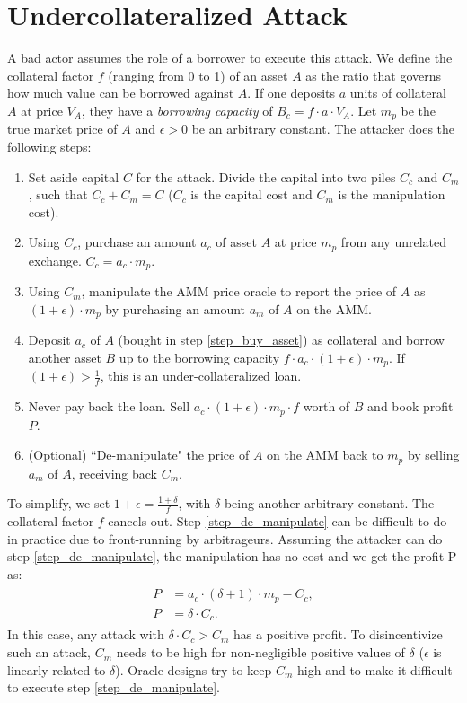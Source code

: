 \section{Undercollateralized Attack}
\label{appendix_a}
A bad actor assumes the role of a borrower to execute this attack. We define the collateral factor $f$ (ranging from 0 to 1) of an asset $A$ as the ratio that governs how much value can be borrowed against $A$. If one deposits $a$ units of collateral $A$ at price $V_A$, they have a \textit{borrowing capacity} of $B_c = f \cdot a \cdot V_A$. Let $m_p$ be the true market price of $A$ and $\epsilon > 0$ be an arbitrary constant. The attacker does the following steps:
\begin{enumerate}
    \item Set aside capital $C$ for the attack. Divide the capital into two piles $C_c$ and $C_m$, such that $C_c + C_m = C$ ($C_c$ is the capital cost and $C_m$ is the manipulation cost). 
    \item \label{step_buy_asset} Using $C_c$, purchase an amount $a_c$ of asset $A$ at price $m_p$ from any unrelated exchange. $C_c = a_c \cdot m_p$.
    \item \label{step_manipulate} Using $C_m$, manipulate the AMM price oracle to report the price of $A$ as $(1 + \epsilon) \cdot m_p$ by purchasing an amount $a_m$ of $A$ on the AMM.
    \item Deposit $a_c$ of $A$ (bought in step \ref{step_buy_asset}) as collateral and borrow another asset $B$ up to the borrowing capacity $f \cdot a_c \cdot (1 + \epsilon)\cdot m_p$. If $(1 + \epsilon) > \frac{1}{f}$, this is an under-collateralized loan.
    \item Never pay back the loan. Sell $a_c \cdot (1 + \epsilon)\cdot m_p \cdot f$ worth of $B$ and book profit $P$.
    \item \label{step_de_manipulate} (Optional) ``De-manipulate" the price of $A$ on the AMM back to $m_p$ by selling $a_m$ of $A$, receiving back $C_m$.
\end{enumerate}
To simplify, we set $1+\epsilon = \frac{1 + \delta}{f}$, with $\delta$ being another arbitrary constant. The collateral factor $f$ cancels out. Step \ref{step_de_manipulate} can be difficult to do in practice due to front-running by arbitrageurs.
Assuming the attacker can do step \ref{step_de_manipulate}, the manipulation has no cost and we get the profit P as:
\begin{align*}
\begin{split}
    P &= a_c\cdot(\delta+1)\cdot m_p - C_c, \\
    P &= \delta\cdot C_c.
\end{split}
\end{align*}
In this case, any attack with $\delta \cdot C_c > C_m$ has a positive profit. To disincentivize such an attack, $C_m$ needs to be high for non-negligible positive values of $\delta$ ($\epsilon$ is linearly related to $\delta$). Oracle designs try to keep $C_m$ high and to make it difficult to execute step \ref{step_de_manipulate}. 

